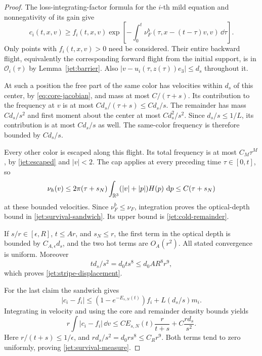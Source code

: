 \begin{proof}
The loss-integrating-factor formula for the \(i\)-th mild equation
and nonnegativity of its gain give
\[
 c_i(t,x,v)\ge f_i(t,x,v)
 \exp\left[-\int_0^t
   \nu_F^b(\tau,x-(t-\tau)v,v)\,\dd\tau\right].
\]
Only points with \(f_i(t,x,v)>0\) need be considered.
Their entire backward flight, equivalently the corresponding
forward flight from the initial support, is in
\(\mathcal O_i(\tau)\) by Lemma~\ref{jet:barrier}.
Also \(|v-u_i(\tau,z(\tau))e_3|\le d_s\) throughout it.

At such a position the free part of the same color has velocities
within \(d_s\) of this center, by
\eqref{eq:core-jacobian}, and mass at most \(C/(\tau+s)\).
Its contribution to the frequency at \(v\) is at most
\(Cd_s/(\tau+s)\le Cd_s/s\).
The remainder has mass \(Cd_s/s^2\) and first moment about the
center at most \(Cd_s^2/s^2\).  Since \(d_s/s\le1/L\), its
contribution is at most \(Cd_s/s\) as well.
The same-color frequency is therefore bounded by \(Cd_s/s\).

Every other color is escaped along this flight.  Its total
frequency is at most \(C_M\tau^M\), by
\eqref{jet:escaped} and \(|v|<2\).
The cap applies at every preceding time \(\tau\in[0,t]\), so
\[
 \nu_h(v)\le 2\pi(\tau+s_N)
       \int_{\mathbb R^3}(|v|+|p|)H(p)\,\,\mathrm d p
       \le C(\tau+s_N)
\]
at these bounded velocities.  Since \(\nu_F^b\le\nu_F\),
integration proves the optical-depth bound in
\eqref{jet:survival-sandwich}.  Its upper bound is
\eqref{jet:cold-remainder}.

If \(s/r\in[\epsilon,R]\), \(t\le Ar\), and \(s_N\le r\), the
first term in the optical depth is bounded by
\(C_{A,\epsilon}d_s\), and the two hot terms are \(O_A(r^2)\).
All stated convergence is uniform.  Moreover
\[
 td_s/s^2=d_0t s^8\le d_0 A R^8r^9,
\]
which proves \eqref{jet:stripe-displacement}.

For the last claim the sandwich gives
\[
 |c_i-f_i|\le
       (1-e^{-E_{s,N}(t)})f_i+L(d_s/s)m_i.
\]
Integrating in velocity and using the core and remainder density
bounds yields
\[
 r\int|c_i-f_i|\,\dd v
 \le C E_{s,N}(t)\frac r{t+s}
       +C\frac{r d_s}{s^2}.
\]
Here \(r/(t+s)\le1/\epsilon\), and
\(r d_s/s^2=d_0r s^8\le C_Rr^9\).
Both terms tend to zero uniformly, proving
\eqref{jet:survival-measure}.
\end{proof}
